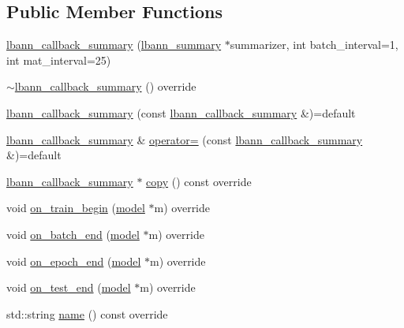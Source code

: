 \subsection*{Public Member Functions}
\begin{DoxyCompactItemize}
\item 
\hyperlink{classlbann_1_1lbann__callback__summary_aaf405a703a4047cc3c442d0a21a5d208}{lbann\+\_\+callback\+\_\+summary} (\hyperlink{classlbann_1_1lbann__summary}{lbann\+\_\+summary} $\ast$summarizer, int batch\+\_\+interval=1, int mat\+\_\+interval=25)
\item 
\hyperlink{classlbann_1_1lbann__callback__summary_afecb595caaee55e32837840ba902eaee}{$\sim$lbann\+\_\+callback\+\_\+summary} () override
\item 
\hyperlink{classlbann_1_1lbann__callback__summary_aed7ed143ba18927124e76f6442228810}{lbann\+\_\+callback\+\_\+summary} (const \hyperlink{classlbann_1_1lbann__callback__summary}{lbann\+\_\+callback\+\_\+summary} \&)=default
\item 
\hyperlink{classlbann_1_1lbann__callback__summary}{lbann\+\_\+callback\+\_\+summary} \& \hyperlink{classlbann_1_1lbann__callback__summary_a4e2c3d2fcb09c5dc00035be86441ad53}{operator=} (const \hyperlink{classlbann_1_1lbann__callback__summary}{lbann\+\_\+callback\+\_\+summary} \&)=default
\item 
\hyperlink{classlbann_1_1lbann__callback__summary}{lbann\+\_\+callback\+\_\+summary} $\ast$ \hyperlink{classlbann_1_1lbann__callback__summary_ae6f1ba60d92f4599361ce5bd5f70caa7}{copy} () const override
\item 
void \hyperlink{classlbann_1_1lbann__callback__summary_a1ff0c4368aee47c294b9c11a5176b9e0}{on\+\_\+train\+\_\+begin} (\hyperlink{classlbann_1_1model}{model} $\ast$m) override
\item 
void \hyperlink{classlbann_1_1lbann__callback__summary_a89b18186fdaa7b6a7a0e9ab8ee334d88}{on\+\_\+batch\+\_\+end} (\hyperlink{classlbann_1_1model}{model} $\ast$m) override
\item 
void \hyperlink{classlbann_1_1lbann__callback__summary_a404e64dcedfcba611510379f99dcace9}{on\+\_\+epoch\+\_\+end} (\hyperlink{classlbann_1_1model}{model} $\ast$m) override
\item 
void \hyperlink{classlbann_1_1lbann__callback__summary_a8dced0a202df3daaece138a7b958e544}{on\+\_\+test\+\_\+end} (\hyperlink{classlbann_1_1model}{model} $\ast$m) override
\item 
std\+::string \hyperlink{classlbann_1_1lbann__callback__summary_a79814488c1ed0123b335a4cd1a236724}{name} () const override
\end{DoxyCompactItemize}
